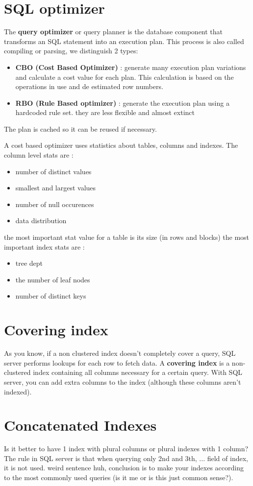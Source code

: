 \documentclass{report}
\begin{document}
		\section{SQL optimizer}
			The \textbf{query optimizer }or query planner is the database component that transforms an SQL statement into an execution plan. This process is also called compiling or parsing, we distinguish 2 types: 
			\begin{itemize}
				\item \textbf{CBO (Cost Based Optimizer)} : generate many execution plan variations and calculate a cost value for each plan. This calculation is based on the operations in use and de estimated row numbers.
				\item \textbf{RBO (Rule Based optimizer)} : generate the execution plan using a hardcoded rule set. they are less flexible and almost extinct
			\end{itemize}
			The plan is cached so it can be reused if necessary.

			A cost based optimizer uses statistics about tables, columns and indexes. 
			The column level stats are : 
			\begin{itemize}
				\item number of distinct values
				\item smallest and largest values
				\item number of null occurences
				\item data distribution
			\end{itemize}
			the most important stat value for a table is its size (in rows and blocks)
			the most important index stats are : 
			\begin{itemize}
				\item tree dept
				\item the number of leaf nodes
				\item number of distinct keys
			\end{itemize}
		\section{Covering index}
			As you know, if a non clustered index doesn't completely cover a query, SQL server performs lookups for each row to fetch data. A \textbf{covering index} is a non-clustered index containing all columns necessary for a certain query. With SQL server, you can add extra columns to the index (although these columns aren't indexed).
		\section{Concatenated Indexes}
			Is it better to have 1 index with plural columns or plural indexes with 1 column? The rule in SQL server is that when querying only 2nd and 3th, ... field of index, it is not used. weird sentence huh, conclusion is to make your indexes according to the most commonly used queries (is it me or is this just common sense?).
\end{document}
